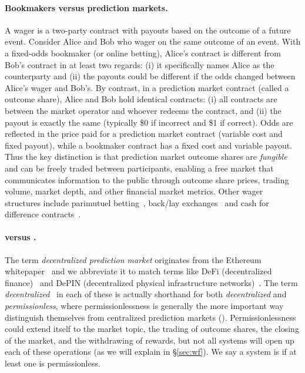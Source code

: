 \paragraph{Bookmakers versus prediction markets.}

A wager is a two-party contract with payouts based on the outcome of a future event. Consider Alice and Bob who wager on the same outcome of an event. With a fixed-odds bookmaker (or online betting), Alice's contract is different from Bob's contract in at least two regards: (i) it specifically names Alice as the counterparty and (ii) the payouts could be different if the odds changed between Alice's wager and Bob's. By contrast, in a prediction market contract (called a outcome share), Alice and Bob hold identical contracts: (i) all contracts are between the market operator and whoever redeems the contract, and (ii) the payout is exactly the same (typically \$0 if incorrect and \$1 if correct). Odds are reflected in the price paid for a prediction market contract (\ie variable cost and fixed payout), while a bookmaker contract has a fixed cost and variable payout. Thus the key distinction is that prediction market outcome shares are \textit{fungible} and can be freely traded between participants, enabling a free market that communicates information to the public through outcome share prices, trading volume, market depth, and other financial market metrics. Other wager structures include parimutuel betting~\cite{ThZi88,KNZ08,ULSM25}, back/lay exchanges~\cite{CHKL21} and cash for difference contracts~\cite{ACES17}.

\paragraph{\cepm versus \depm.}

The term \textit{decentralized prediction market} originates from the Ethereum whitepaper~\cite{But13} and we abbreviate it \depm to match terms like DeFi (decentralized finance)~\cite{WPG+22} and DePIN (decentralized physical infrastructure networks)~\cite{LWS+24,MEB+25}. The term \textit{decentralized}~\cite{OKK24} in each of these is actually shorthand for both \textit{decentralized} and \textit{permissionless}, where permissionlessness is generally the more important way \depms distinguish themselves from centralized prediction markets (\cepms). Permissionlessness could extend itself to the market topic, the trading of outcome shares, the closing of the market, and the withdrawing of rewards, but not all systems will open up each of these operations (as we will explain in \S\ref{sec:wf}). We say a system is \depm if at least one is permissionless.

